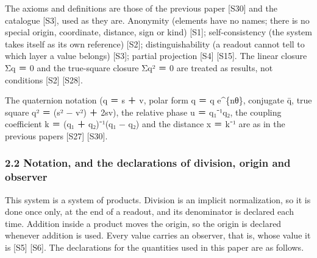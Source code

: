 \documentclass[
  a4paper,
]{article}
\begin{document}
The axioms and definitions are those of the previous paper {[}S30{]} and
the catalogue {[}S3{]}, used as they are. Anonymity (elements have no
names; there is no special origin, coordinate, distance, sign or kind)
{[}S1{]}; self-consistency (the system takes itself as its own
reference) {[}S2{]}; distinguishability (a readout cannot tell to which
layer a value belongs) {[}S3{]}; partial projection {[}S4{]} {[}S15{]}.
The linear closure Σq ＝ 0 and the true-square closure Σq² ＝ 0 are
treated as results, not conditions {[}S2{]} {[}S28{]}.

The quaternion notation (q ＝ s ＋ v, polar form q ＝
\textbar q\textbar{} e\^{}\{nθ\}, conjugate q̄, true square q² ＝ (s² −
\textbar v\textbar²) ＋ 2sv), the relative phase u ＝ q₁⁻¹q₂, the
coupling coefficient k ＝ (q₁ ＋ q₂)⁻¹(q₁ − q₂) and the distance x ＝
k⁻¹ are as in the previous papers {[}S27{]} {[}S30{]}.

\subsubsection{2.2 Notation, and the declarations of division, origin
and
observer}\label{notation-and-the-declarations-of-division-origin-and-observer}

This system is a system of products. Division is an implicit
normalization, so it is done once only, at the end of a readout, and its
denominator is declared each time. Addition inside a product moves the
origin, so the origin is declared whenever addition is used. Every value
carries an observer, that is, whose value it is {[}S5{]} {[}S6{]}. The
declarations for the quantities used in this paper are as follows.
\end{document}
